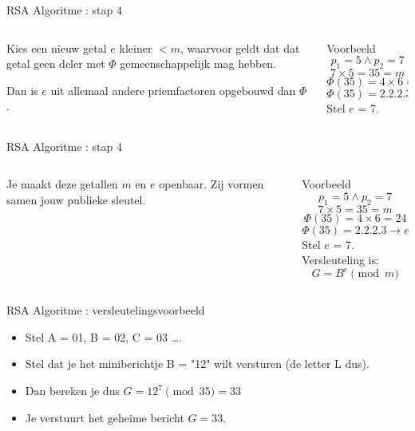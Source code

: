 \documentclass{beamer}
\begin{document}
\begin{frame}{RSA Algoritme : stap 4}
	\begin{columns}
		\begin{column}[T]{0.5\textwidth}
			Kies een nieuw getal $e$ kleiner $ < m$, waarvoor geldt dat dat getal geen deler met $\Phi$ gemeenschappelijk mag hebben.
			
			Dan is $e$  uit allemaal andere priemfactoren opgebouwd dan $\Phi$.
		\end{column}
		\begin{column}[T]{0.5\textwidth}
			Voorbeeld
			\[ p_1 = 5 \wedge  p_2 = 7\]
			\[ 7 \times 5 = 35 = m \]
			\[ \Phi(35) =4 \times 6 = 24 \]
			\[ \Phi(35) =  2 . 2 . 2 . 3  \rightarrow e \in {5,7,25} \]  
			Stel $e$ = 7.
		\end{column}
	\end{columns}	
\end{frame}


\begin{frame}{RSA Algoritme : stap 4}
	\begin{columns}
		\begin{column}[T]{0.5\textwidth}
			Je maakt deze getallen  $m$ en $e$ openbaar. Zij vormen samen jouw publieke sleutel.
		\end{column}
		\begin{column}[T]{0.5\textwidth}
			Voorbeeld
			\[ p_1 = 5 \wedge  p_2 = 7\]
			\[ 7 \times 5 = 35 = m \]
			\[ \Phi(35) =4 \times 6 = 24 \]
			\[ \Phi(35) =  2 . 2 . 2 . 3  \rightarrow e \in {5,7,25} \]  
			Stel $e$ = 7. \\
			Versleuteling is: \[ G = B^e  \pmod{m} \]
		\end{column}
	\end{columns}	
\end{frame}

\begin{frame}{RSA Algoritme : versleutelingsvoorbeeld}
	\begin{itemize}
		\item Stel A = 01, B = 02, C = 03 \dots.
		\item Stel dat je het miniberichtje B = "12"  wilt versturen (de letter L dus). 
		\item Dan bereken je dus  $G = 12^7 \pmod{35} = 33$
		\item Je verstuurt  het geheime bericht $G = 33$.	
	\end{itemize}
\end{frame}
\end{document}
